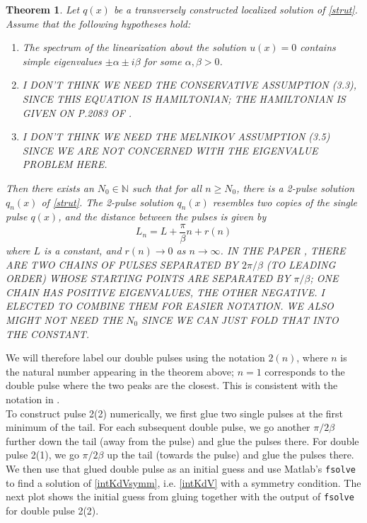 \documentclass[12pt]{article}
\def\N{{\mathbb N}}
\newtheorem{theorem}{Theorem}
\begin{document}
\begin{theorem}
Let $q(x)$ be a transversely constructed localized solution of \eqref{strut}. Assume that the following hypotheses hold:
\begin{enumerate}
	\item The spectrum of the linearization about the solution $u(x) = 0$ contains simple eigenvalues $\pm \alpha \pm i \beta$ for some $\alpha, \beta > 0$.
	\item I DON'T THINK WE NEED THE CONSERVATIVE ASSUMPTION (3.3), SINCE THIS EQUATION IS HAMILTONIAN; THE  HAMILTONIAN IS GIVEN ON P.2083 OF \cite{Sandstede1997}.
	\item I DON'T THINK WE NEED THE MELNIKOV ASSUMPTION (3.5) SINCE WE ARE NOT CONCERNED WITH THE EIGENVALUE PROBLEM HERE.
\end{enumerate}
Then there exists an $N_0 \in \N$ such that for all $n \geq N_0$, there is a 2-pulse solution $q_n(x)$ of \eqref{strut}. The 2-pulse solution $q_n(x)$ resembles two copies of the single pulse $q(x)$, and the distance between the pulses is given by
\begin{equation}\label{pulsedistance}
L_n = L + \frac{\pi}{\beta}n + r(n)
\end{equation}
where $L$ is a constant, and $r(n) \rightarrow 0$ as $n \rightarrow \infty$. IN THE PAPER \cite{Sandstede1997}, THERE ARE TWO CHAINS OF PULSES SEPARATED BY $2 \pi / \beta$ (TO LEADING ORDER) WHOSE STARTING POINTS ARE SEPARATED BY $\pi / \beta$; ONE CHAIN HAS POSITIVE EIGENVALUES, THE OTHER NEGATIVE. I ELECTED TO COMBINE THEM FOR EASIER NOTATION. WE ALSO MIGHT NOT NEED THE $N_0$ SINCE WE CAN JUST FOLD THAT INTO THE CONSTANT.
\end{theorem}

We will therefore label our double pulses using the notation $2(n)$, where $n$ is the natural number appearing in the theorem above; $n = 1$ corresponds to the double pulse where the two peaks are the closest. This is consistent with the notation in \cite{Champneys1993}.\\

To construct pulse 2(2) numerically, we first glue two single pulses at the first minimum of the tail. For each subsequent double pulse, we go another $\pi / 2 \beta$ further down the tail (away from the pulse) and glue the pulses there. For double pulse 2(1), we go $\pi / 2 \beta$ up the tail (towards the pulse) and glue the pulses there. We then use that glued double pulse as an initial guess and use Matlab's \texttt{fsolve} to find a solution of \eqref{intKdVsymm}, i.e. \eqref{intKdV} with a symmetry condition. The next plot shows the initial guess from gluing together with the output of \texttt{fsolve} for double pulse 2(2).
\end{document}

